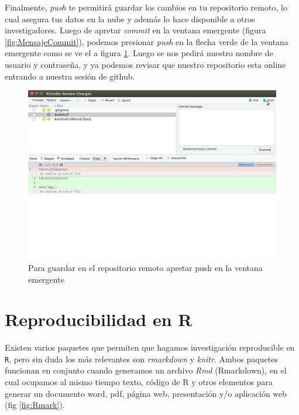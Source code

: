 \documentclass[]{book}
\begin{document}
Finalmente, \emph{push} te permitirá guardar los cambios en tu
repositorio remoto, lo cual asegura tus datos en la nube y además lo
hace disponible a otros investigadores. Luego de apretar \emph{commit}
en la ventana emergente (figura \ref{fig:MensajeCommit}), podemos
presionar \emph{push} en la flecha verde de la ventana emergente como se
ve el a figura \ref{fig:push}. Luego se nos pedirá nuestro nombre de
usuario y contraseña, y ya podemos revisar que nuestro repositorio esta
online entrando a nuestra sesión de github.

\begin{figure}

{\centering \includegraphics[width=0.8\linewidth]{Push} 

}

\caption{Para guardar en el repositorio remoto apretar push en la ventana emergente}\label{fig:push}
\end{figure}

\hypertarget{reproducibilidad-en-r}{%
\section{Reproducibilidad en R}\label{reproducibilidad-en-r}}

Existen varios paquetes que permiten que hagamos investigación
reproducible en \texttt{R}, pero sin duda los más relevantes son
\emph{rmarkdown} y \emph{knitr}. Ambos paquetes funcionan en conjunto
cuando generamos un archivo \emph{Rmd} (Rmarkdown), en el cual ocupamos
al mismo tiempo texto, código de R y otros elementos para generar un
documento word, pdf, página web, presentación y/o aplicación web (fig
\ref{fig:Rmark}).
\end{document}
